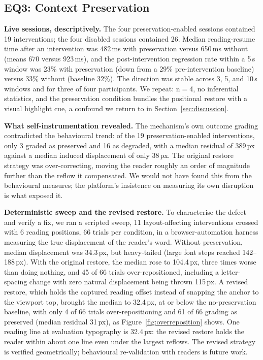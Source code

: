 \subsection{EQ3: Context Preservation}
\label{sec:eval-context}

\textbf{Live sessions, descriptively.}
The four preservation-enabled sessions contained 19 interventions; the four disabled sessions contained 26.
Median reading-resume time after an intervention was 482\,ms with preservation versus 650\,ms without (means 670 versus 923\,ms), and the post-intervention regression rate within a 5\,s window was 23\% with preservation (down from a 29\% pre-intervention baseline) versus 33\% without (baseline 32\%).
The direction was stable across 3, 5, and 10\,s windows and for three of four participants.
We repeat: n$=$4, no inferential statistics, and the preservation condition bundles the positional restore with a visual highlight cue, a confound we return to in Section~\ref{sec:discussion}.

\textbf{What self-instrumentation revealed.}
The mechanism's own outcome grading contradicted the behavioural trend: of the 19 preservation-enabled interventions, only 3 graded as preserved and 16 as degraded, with a median residual of 389\,px against a median induced displacement of only 38\,px.
The original restore strategy was over-correcting, moving the reader roughly an order of magnitude further than the reflow it compensated.
We would not have found this from the behavioural measures; the platform's insistence on measuring its own disruption is what exposed it.

\textbf{Deterministic sweep and the revised restore.}
To characterise the defect and verify a fix, we ran a scripted sweep, 11 layout-affecting interventions crossed with 6 reading positions, 66 trials per condition, in a browser-automation harness measuring the true displacement of the reader's word.
Without preservation, median displacement was 34.3\,px, but heavy-tailed (large font steps reached 142--188\,px).
With the original restore, the median rose to 104.4\,px, three times worse than doing nothing, and 45 of 66 trials over-repositioned, including a letter-spacing change with zero natural displacement being thrown 115\,px.
A revised restore, which holds the captured reading offset instead of snapping the anchor to the viewport top, brought the median to 32.4\,px, at or below the no-preservation baseline, with only 4 of 66 trials over-repositioning and 61 of 66 grading as preserved (median residual 31\,px), as Figure~\ref{fig:overreposition} shows.
One reading line at evaluation typography is 32.4\,px: the revised restore holds the reader within about one line even under the largest reflows.
The revised strategy is verified geometrically; behavioural re-validation with readers is future work.

